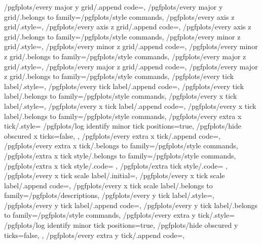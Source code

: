 {	/pgfplots/every major y grid/.append code={},
	/pgfplots/every major y grid/.belongs to family=/pgfplots/style commands,
	/pgfplots/every axis z grid/.style={},
	/pgfplots/every axis z grid/.append code={},
	/pgfplots/every axis z grid/.belongs to family=/pgfplots/style commands,
	/pgfplots/every minor z grid/.style={},
	/pgfplots/every minor z grid/.append code={},
	/pgfplots/every minor z grid/.belongs to family=/pgfplots/style commands,
	/pgfplots/every major z grid/.style={},
	/pgfplots/every major z grid/.append code={},
	/pgfplots/every major z grid/.belongs to family=/pgfplots/style commands,
	/pgfplots/every tick label/.style={},
	/pgfplots/every tick label/.append code={},
	/pgfplots/every tick label/.belongs to family=/pgfplots/style commands,
	/pgfplots/every x tick label/.style={},
	/pgfplots/every x tick label/.append code={},
	/pgfplots/every x tick label/.belongs to family=/pgfplots/style commands,
	/pgfplots/every extra x tick/.style={
		/pgfplots/log identify minor tick positions=true,
		/pgfplots/hide obscured x ticks=false,
	},
	/pgfplots/every extra x tick/.append code={},
	/pgfplots/every extra x tick/.belongs to family=/pgfplots/style commands,
	/pgfplots/extra x tick style/.belongs to family=/pgfplots/style commands,
	/pgfplots/extra x tick style/.code={%
	},
	/pgfplots/extra tick style/.code={%
	},
	/pgfplots/every x tick scale label/.initial=,%
	/pgfplots/every x tick scale label/.append code={},
	/pgfplots/every x tick scale label/.belongs to family=/pgfplots/descriptions,
	/pgfplots/every y tick label/.style={},
	/pgfplots/every y tick label/.append code={},
	/pgfplots/every y tick label/.belongs to family=/pgfplots/style commands,
	/pgfplots/every extra y tick/.style={
		/pgfplots/log identify minor tick positions=true,
		/pgfplots/hide obscured y ticks=false,
	},
	/pgfplots/every extra y tick/.append code={},
}
